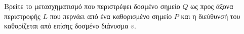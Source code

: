 \begin{example}
Βρείτε το μετασχηματισμό που περιστρέφει δοσμένο σημείο \(Q\) ως προς άξονα περιστροφής \(L\) που περνάει από ένα καθορισμένο σημείο \(P\) και η διεύθυνσή του καθορίζεται από επίσης δοσμένο διάνυσμα \(v\).  	
\end{example}

\begin{solution}
	
\end{solution}
